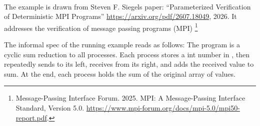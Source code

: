 \begin{isabellebody}
\ \ \isamarkupfalse%
\isanewline
{}\isamarkupfalse%
%
\endisatagproof
{\isafoldproof}%
%
\isadelimproof
%
\endisadelimproof
%
\isadelimdocument
%
\endisadelimdocument
%
\isatagdocument
%
\isamarkuptrue%
%
\endisatagdocument
{\isafolddocument}%
%
\isadelimdocument
%
\endisadelimdocument
%
\begin{isamarkuptext}%
The example is drawn from Steven F. Siegels paper:
``Parameterized Verification of Deterministic MPI Programs''
\url{https://arxiv.org/pdf/2607.18049}, 2026. It addresses 
the verification of message passing programs (MPI) 
\footnote{Message-Passing Interface Forum. 2025. MPI: A Message-Passing
Interface Standard, Version 5.0. 
\url{https://www.mpi-forum.org/docs/mpi-5.0/mpi50-report.pdf}.}

The informal spec of the running example reads as follows:
The program  is a cyclic sum reduction to all processes. Each
process stores a int number in , then repeatedly sends to
its left, receives from its right, and adds the received value to
sum. At the end, each process holds the sum of the original
array  of values.


\end{isamarkuptext}
\end{isabellebody}
